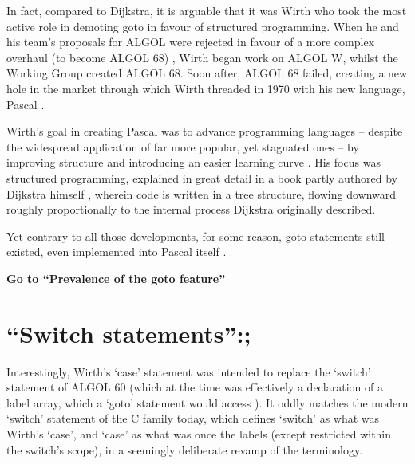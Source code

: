 \documentclass{journal}
\begin{document}
In fact, compared to Dijkstra, it is arguable that it was Wirth who took the most active role in demoting goto in favour of structured programming. When he and his team's proposals for ALGOL were rejected in favour of a more complex overhaul (to become ALGOL 68) \cite{pascalrecollections}, Wirth began work on ALGOL W, whilst the Working Group created ALGOL 68. Soon after, ALGOL 68 failed, creating a new hole in the market through which Wirth threaded in 1970 with his new language, Pascal \cite{pascalrecollections}.

Wirth's goal in creating Pascal was to advance programming languages -- despite the widespread application of far more popular, yet stagnated ones -- by improving structure and introducing an easier learning curve \cite{pascal}. His focus was structured programming, explained in great detail in a book partly authored by Dijkstra himself \cite{structured}, wherein code is written in a tree structure, flowing downward roughly proportionally to the internal process Dijkstra originally \cite{goto} described.

Yet contrary to all those developments, for some reason, goto statements still existed, even implemented into Pascal itself \cite{pascal}.

\textbf{Go to ``Prevalence of the goto feature''}

\setcounter{section}{1}
\section{``Switch statements'':;}
Interestingly, Wirth's `case' statement was intended to replace the `switch' statement of ALGOL 60 (which at the time was effectively a declaration of a label array, which a `goto' statement would access \cite{algolguide}). It oddly matches the modern `switch' statement of the C family today, which defines `switch' as what was Wirth's `case', and `case' as what was once the labels (except restricted within the switch's scope), in a seemingly deliberate revamp of the terminology.
\end{document}
